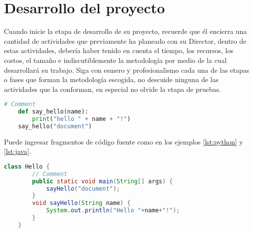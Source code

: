 \chapter{Desarrollo del proyecto}

Cuando inicie la etapa de desarrollo de su proyecto, recuerde que él encierra
una cantidad de actividades que previamente ha planeado con su Director,
dentro de estas actividades, debería haber tenido en cuenta el tiempo, los
recursos, los costos, el tamaño e indiscutiblemente la metodología por medio
de la cual desarrollará su trabajo. Siga con esmero y profesionalismo cada una
de las etapas o fases que forman la metodología escogida, no descuide ninguna
de las actividades que la conforman, en especial no olvide la etapa de pruebas.

\begin{lstlisting}[language=Python, caption=Python source code, label=lst:python]
    # Comment
    def say_hello(name):
        print("hello " + name + "!")
    say_hello("document")
\end{lstlisting}

Puede ingresar fragmentos de código fuente como en los ejemplos \ref{lst:python} 
y \ref{lst:java}.

\begin{lstlisting}[language=Java, caption=Java source code, label=lst:java]
    class Hello {
        // Comment
        public static void main(String[] args) {
            sayHello("document");
        }
        void sayHello(String name) {
            System.out.println("Hello "+name+"!");
        }
    }
\end{lstlisting}


